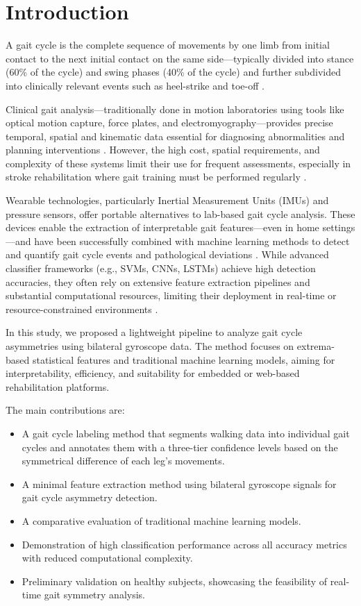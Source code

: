 \section{Introduction}
\label{sec:introduction}
A gait cycle is the complete sequence of movements by one limb from initial contact to the next initial contact on the same side—typically divided into stance 
(60\% of the cycle) and swing phases (40\% of the cycle) and further subdivided into clinically relevant events such as heel-strike and toe-off \cite{ref1,ref2}.

Clinical gait analysis—traditionally done in motion laboratories using tools like optical motion capture, force plates, and electromyography—provides precise 
temporal, spatial and kinematic data essential for diagnosing abnormalities and planning interventions \cite{ref3,ref4}. However, the high cost, spatial requirements,
and complexity of these systems limit their use for frequent assessments, especially in stroke rehabilitation where gait training must be performed 
regularly \cite{ref5}.

Wearable technologies, particularly Inertial Measurement Units (IMUs) and pressure sensors, offer portable alternatives to lab-based gait cycle analysis. These 
devices enable the extraction of interpretable gait features—even in home settings—and have been successfully combined with machine learning methods to detect 
and quantify gait cycle events and pathological deviations \cite{ref6,ref7}. While advanced classifier frameworks (e.g., SVMs, CNNs, LSTMs) achieve high detection 
accuracies, they often rely on extensive feature extraction pipelines and substantial computational resources, limiting their deployment in real-time or 
resource-constrained environments \cite{ref8}.

In this study, we proposed a lightweight pipeline to analyze gait cycle asymmetries using bilateral gyroscope data. The method focuses on extrema-based statistical 
features and traditional machine learning models, aiming for interpretability, efficiency, and suitability for embedded or web-based rehabilitation platforms. 

The main contributions are:
\begin{itemize}
    \item A gait cycle labeling method that segments walking data into individual gait cycles and annotates them with a three-tier confidence levels based on the 
    symmetrical difference of each leg's movements.
    \item A minimal feature extraction method using bilateral gyroscope signals for gait cycle asymmetry detection.
    \item A comparative evaluation of traditional machine learning models.
    \item Demonstration of high classification performance across all accuracy metrics with reduced computational complexity.
    \item Preliminary validation on healthy subjects, showcasing the feasibility of real-time gait symmetry analysis.
\end{itemize}

